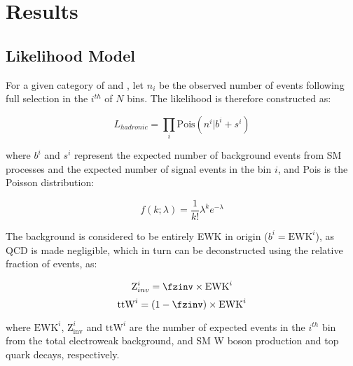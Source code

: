 \chapter{Results}
\label{ch:7}

\ifpdf
    \graphicspath{{Chapter7/Figs/Raster/}{Chapter7/Figs/PDF/}{Chapter7/Figs/}}
\else
    \graphicspath{{Chapter7/Figs/Vector/}{Chapter7/Figs/}}
\fi


\section{Likelihood Model}  %
\label{sec:results_likelihood}

For a given category of \nb and \nj, let $n_i$ be the observed number of events 
following full selection in the $i^{th}$ of $N$ \HT bins. The likelihood is 
therefore constructed as:

\begin{equation}
L_{hadronic} = \prod_i \text{Pois}(n^i | b^i + s^i)
\end{equation}

where $b^i$ and $s^i$ represent the expected number of background events from SM 
processes and the expected number of signal events in the bin $i$, and Pois is 
the Poisson distribution:

\begin{equation}
f(k;\lambda) = \frac{1}{k!}\lambda^k e^{-\lambda}
\end{equation}

The background is considered to be entirely EWK in origin ($b^i = \text{EWK}^i$), as QCD
is made negligible, which in turn can be deconstructed using the relative fraction
of \zinv events, \fzinv as:

\begin{equation}
\text{Z}_{inv}^i = \fzinv \times \text{EWK}^i
\end{equation}
\begin{equation}
\text{ttW}^i = (1-\fzinv) \times \text{EWK}^i
\end{equation}

where $\text{EWK}^i$, $\text{Z}_{\text{inv}}^i$ and $\text{ttW}^i$ are the number of 
expected events in the $i^{th}$ bin from the total electroweak background, \zinv
and SM W boson production and top quark decays, respectively.

